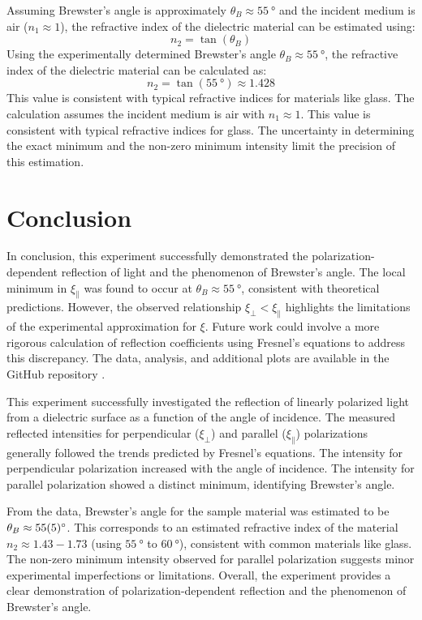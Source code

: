 \documentclass[journal]{IEEEtran}
\begin{document}
Assuming Brewster's angle is approximately $\theta_B \approx \SI{55}{\degree}$ and the incident medium is air ($n_1 \approx 1$), the refractive index of the dielectric material can be estimated using:
\begin{equation}
    n_2 = \tan(\theta_B)
\end{equation}
Using the experimentally determined Brewster's angle $\theta_B \approx \SI{55}{\degree}$, the refractive index of the dielectric material can be calculated as:
\begin{equation}
    n_2 = \tan(\SI{55}{\degree}) \approx 1.428
\end{equation}
This value is consistent with typical refractive indices for materials like glass. The calculation assumes the incident medium is air with $n_1 \approx 1$.
This value is consistent with typical refractive indices for glass. The uncertainty in determining the exact minimum and the non-zero minimum intensity limit the precision of this estimation.

\section{Conclusion}
In conclusion, this experiment successfully demonstrated the polarization-dependent reflection of light and the phenomenon of Brewster's angle. The local minimum in $\xi_{\parallel}$ was found to occur at $\theta_B \approx \SI{55}{\degree}$, consistent with theoretical predictions. However, the observed relationship $\xi_{\perp} < \xi_{\parallel}$ highlights the limitations of the experimental approximation for $\xi$. Future work could involve a more rigorous calculation of reflection coefficients using Fresnel's equations to address this discrepancy.
The data, analysis, and additional plots are available in the GitHub repository \cite{github}.

This experiment successfully investigated the reflection of linearly polarized light from a dielectric surface as a function of the angle of incidence. The measured reflected intensities for perpendicular ($\xi_{\perp}$) and parallel ($\xi_{\parallel}$) polarizations generally followed the trends predicted by Fresnel's equations. The intensity for perpendicular polarization increased with the angle of incidence. The intensity for parallel polarization showed a distinct minimum, identifying Brewster's angle.

From the data, Brewster's angle for the sample material was estimated to be $\theta_B \approx \SI{55 \pm 5}{\degree}$. This corresponds to an estimated refractive index of the material $n_2 \approx 1.43 - 1.73$ (using $\SI{55}{\degree}$ to $\SI{60}{\degree}$), consistent with common materials like glass. The non-zero minimum intensity observed for parallel polarization suggests minor experimental imperfections or limitations. Overall, the experiment provides a clear demonstration of polarization-dependent reflection and the phenomenon of Brewster's angle.
\end{document}
